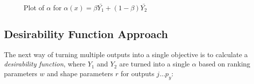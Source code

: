 \documentclass[12pt]{article}
\begin{document}
\vspace{5mm}

\begin{figure}[h]
\centering
{}

\caption{Plot of $\alpha$ for $\alpha(x)=\beta\bar{Y_1}+(1-\beta)\bar{Y_2}$}
\end{figure}

\vspace{5mm}

\subsection{Desirability Function Approach}

The next way of turning multiple outputs into a single objective is to calculate a \emph{desirability function}, where $Y_1$ and $Y_2$ are turned into a single $\alpha$ based on ranking parameters $w$ and shape parameters $r$ for outputs $j ... p_y$:
\end{document}
